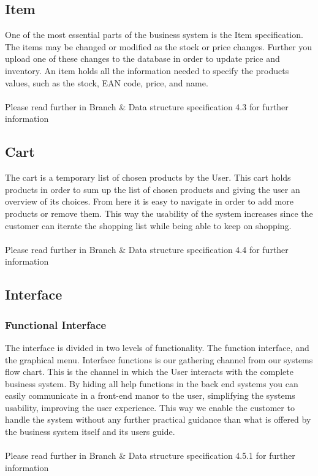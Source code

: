 \documentclass[11pt]{article}
\begin{document}
\subsection{Item}
One of the most essential parts of the business system is the Item specification. The items may be changed or modified as the stock or price changes. Further you upload one of these changes to the database in order to update price and inventory. An item holds all the information needed to specify the products values, such as the stock, EAN code, price, and name.
\\\\
Please read further in Branch \& Data structure specification 4.3 for further information
\subsection{Cart}
The cart is a temporary list of chosen products by the User.  This cart holds products in order to sum up the list of chosen products and giving the user an overview of its choices. From here it is easy to navigate in order to add more products or remove them. This way the usability of the system increases since the customer can iterate the shopping list while being able to keep on shopping.\\\\
Please read further in Branch \& Data structure specification 4.4 for further information\\
\newpage
\subsection{Interface}
\subsubsection{Functional Interface}
The interface is divided in two levels of functionality. The function interface, and the graphical menu.
Interface functions is our gathering channel from our systems flow chart. This is the channel in which the User interacts with the complete business system. By hiding all help functions in the back end systems you can easily communicate in a front-end manor to the user, simplifying the systems usability, improving the user experience. This way we enable the customer to handle the system without any further practical guidance than what is offered by the business system itself and its users guide.
\\\\
Please read further in Branch \& Data structure specification 4.5.1 for further information
\end{document}
